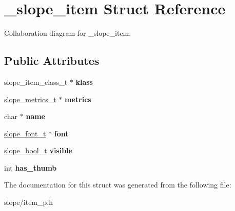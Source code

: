\hypertarget{struct__slope__item}{\section{\+\_\+slope\+\_\+item Struct Reference}
\label{struct__slope__item}
}


Collaboration diagram for \+\_\+slope\+\_\+item\+:
\subsection*{Public Attributes}
\begin{DoxyCompactItemize}
\item 
\hypertarget{struct__slope__item_add7193a54a1fabdb37cd26d048987395}{slope\+\_\+item\+\_\+class\+\_\+t $\ast$ {\bfseries klass}}\label{struct__slope__item_add7193a54a1fabdb37cd26d048987395}

\item 
\hypertarget{struct__slope__item_ac7bdb1cdc4aaf1fd8ae234eebc1e8e13}{\hyperlink{group__Metrics_gab80787ee8ae8dc449e770249fe0e3c35}{slope\+\_\+metrics\+\_\+t} $\ast$ {\bfseries metrics}}\label{struct__slope__item_ac7bdb1cdc4aaf1fd8ae234eebc1e8e13}

\item 
\hypertarget{struct__slope__item_a3a154a02eef112186595310fd7270769}{char $\ast$ {\bfseries name}}\label{struct__slope__item_a3a154a02eef112186595310fd7270769}

\item 
\hypertarget{struct__slope__item_a45d356cbfeac87fc96492f8392949376}{\hyperlink{group__Primitives_ga29945f78eef5fcab497a3d15908b4b73}{slope\+\_\+font\+\_\+t} $\ast$ {\bfseries font}}\label{struct__slope__item_a45d356cbfeac87fc96492f8392949376}

\item 
\hypertarget{struct__slope__item_aa937969eaa4af7e5be86b02f7d7ee377}{\hyperlink{group__Primitives_gac55afa016ca777119a6c343d1655d558}{slope\+\_\+bool\+\_\+t} {\bfseries visible}}\label{struct__slope__item_aa937969eaa4af7e5be86b02f7d7ee377}

\item 
\hypertarget{struct__slope__item_a3b8509ebb99801b1140a279aa79c629f}{int {\bfseries has\+\_\+thumb}}\label{struct__slope__item_a3b8509ebb99801b1140a279aa79c629f}

\end{DoxyCompactItemize}


The documentation for this struct was generated from the following file\+:\begin{DoxyCompactItemize}
\item 
slope/item\+\_\+p.\+h\end{DoxyCompactItemize}
